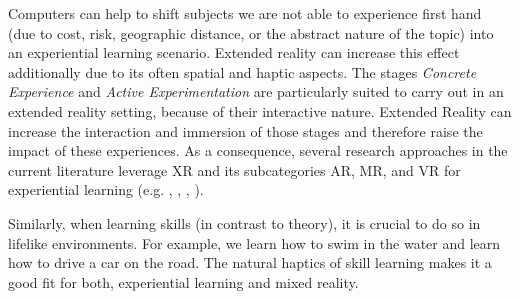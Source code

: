 Computers can help to shift subjects we are not able to experience first hand (due to cost, risk, geographic distance, or the abstract nature of the topic) into an experiential learning scenario. Extended reality can increase this effect additionally due to its often spatial and haptic aspects.
The stages \emph{Concrete Experience} and \emph{Active Experimentation} are particularly suited to carry out in an extended reality setting, because of their interactive nature. Extended Reality can increase the interaction and immersion of those stages and therefore raise the impact of these experiences.
As a consequence, several research approaches in the current literature leverage XR and its subcategories AR, MR, and VR for experiential learning (e.g. \cite{asad2021virtual}, \cite{majgaard2020virtual}, \cite{wang2007experiential}, \cite{pueschel:2013:MRCG}).

Similarly, when learning skills (in contrast to theory), it is crucial to do so in lifelike environments. For example, we learn how to swim in the water and learn how to drive a car on the road. The natural haptics of skill learning makes it a good fit for both, experiential learning and mixed reality.